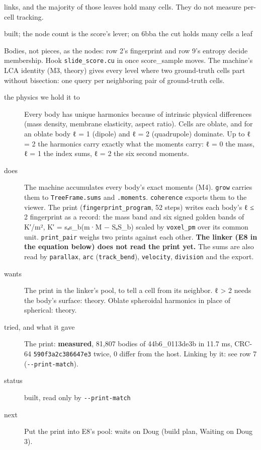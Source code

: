 \begin{description}
links, and the majority of those leaves hold many cells. They do not measure per-cell tracking.
\item[{status}] built; the node count is the score's lever; on 6bba the cut holds many cells a leaf
\item[{next}] Bodies, not pieces, as the nodes: row 2's fingerprint and row 9's entropy decide membership. Hook \texttt{slide\_\allowbreak{}score.\allowbreak{}cu} in once score\_\allowbreak{}sample moves. The machine's LCA identity (M3, theory) gives every level where two ground-truth cells part without bisection: one query per neighboring pair of ground-truth cells.
\end{description}

\begin{description}
\item[{the physics we hold it to}] Every body has unique harmonics because of intrinsic physical differences (mass density, membrane elasticity, aspect ratio). Cells are oblate, and for an oblate body ℓ = 1 (dipole) and ℓ = 2 (quadrupole) dominate. Up to ℓ = 2 the harmonics carry exactly what the moments carry: ℓ = 0 the mass, ℓ = 1 the index sums, ℓ = 2 the six second moments.
\item[{does}] The machine accumulates every body's exact moments (M4). \texttt{grow} carries them to \texttt{Tree\allowbreak{}Frame.\allowbreak{}sums} and \texttt{.\allowbreak{}moments}. \texttt{coherence} exports them to the viewer. The print (\texttt{fingerprint\_\allowbreak{}program}, 52 steps) writes each body's ℓ ≤ 2 fingerprint as a record: the mass band and six signed golden bands of K′/m², K′ = sₐs\_\allowbreak{}b(m·M − SₐS\_\allowbreak{}b) scaled by \texttt{voxel\_\allowbreak{}pm} over its common unit. \texttt{print\_\allowbreak{}pair} weighs two prints against each other. \textbf{The linker (E8 in the equation below) does not read the print yet.} The sums are also read by \texttt{parallax}, \texttt{arc} (\texttt{track\_\allowbreak{}bend}), \texttt{velocity}, \texttt{division} and the export.
\item[{wants}] The print in the linker's pool, to tell a cell from its neighbor. ℓ > 2 needs the body's surface: theory. Oblate spheroidal harmonics in place of spherical: theory.
\item[{tried, and what it gave}] The print: \textbf{measured}, 81,807 bodies of 44b6\_\allowbreak{}0113de3b in 11.7 ms, CRC-64 \texttt{590f3a2c386647e3} twice, 0 differ from the host. Linking by it: see row 7 (\texttt{-\allowbreak{}-\allowbreak{}print-\allowbreak{}match}).
\item[{status}] built, read only by \texttt{-\allowbreak{}-\allowbreak{}print-\allowbreak{}match}
\item[{next}] Put the print into E8's pool: waits on Doug (build plan, Waiting on Doug 3).
\end{description}

